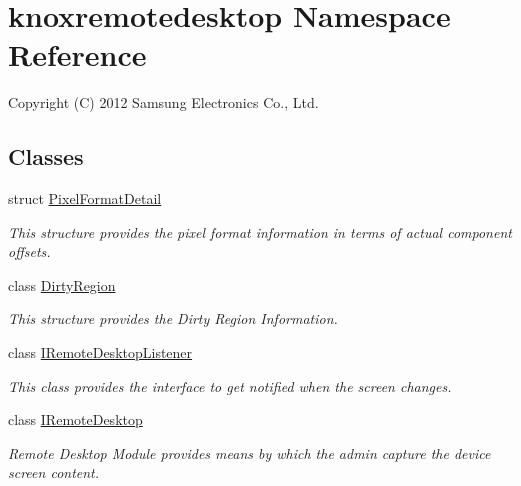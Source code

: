 \hypertarget{namespaceknoxremotedesktop}{\section{knoxremotedesktop \-Namespace \-Reference}
\label{namespaceknoxremotedesktop}
}


\-Copyright (\-C) 2012 \-Samsung \-Electronics \-Co., \-Ltd.  


\subsection*{\-Classes}
\begin{DoxyCompactItemize}
\item 
struct \hyperlink{structknoxremotedesktop_1_1PixelFormatDetail}{\-Pixel\-Format\-Detail}
\begin{DoxyCompactList}\small\item\em \-This structure provides the pixel format information in terms of actual component offsets. \end{DoxyCompactList}\item 
class \hyperlink{classknoxremotedesktop_1_1DirtyRegion}{\-Dirty\-Region}
\begin{DoxyCompactList}\small\item\em \-This structure provides the \-Dirty \-Region \-Information. \end{DoxyCompactList}\item 
class \hyperlink{classknoxremotedesktop_1_1IRemoteDesktopListener}{\-I\-Remote\-Desktop\-Listener}
\begin{DoxyCompactList}\small\item\em \-This class provides the interface to get notified when the screen changes. \end{DoxyCompactList}\item 
class \hyperlink{classknoxremotedesktop_1_1IRemoteDesktop}{\-I\-Remote\-Desktop}
\begin{DoxyCompactList}\small\item\em \-Remote \-Desktop \-Module provides means by which the admin capture the device screen content. \end{DoxyCompactList}\end{DoxyCompactItemize}
